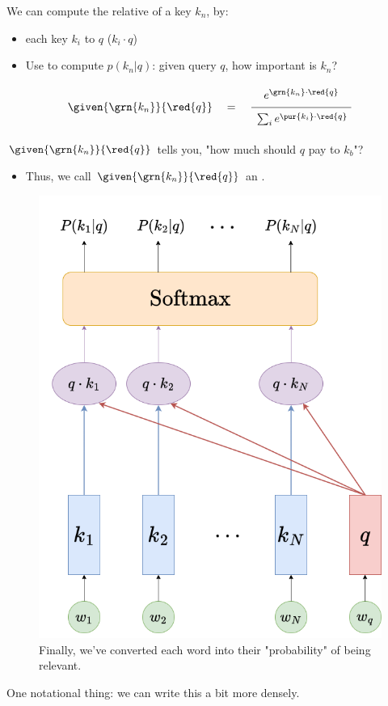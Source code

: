         \begin{kequation}
            We can compute the relative  of a key $k_n$, by:

            \begin{itemize}
                \item {} each key $k_i$ to $q$ ($k_i \cdot q$)

                \item Use  to compute $p(k_n|q)$: given query $q$, how important is $k_n$?
            \end{itemize}


            \begin{equation*}
                    \given{ \grn{k_n} }{ \red{q} } 
                    \quad=\quad
                    \frac{ \phantom{\Big|}  e^{\grn{k_n} \cdot \red{q}} \phantom{\Big|}}
                    {\phantom{\Big|} \sum_i e^{\pur{k_i} \cdot \red{q} } \phantom{\Big|}}
            \end{equation*}

            $\given{ \grn{k_n} }{ \red{q} }$ tells you, "how much  should $q$ pay to $k_b$"? 

            \begin{itemize}
                \item Thus, we call $\given{ \grn{k_n} }{ \red{q} }$ an .
            \end{itemize}
        \end{kequation}

        \begin{figure}[H]
            \centering
            \includegraphics[width=0.3\linewidth]{images/transformers_images/softmax_attention.png}
            \caption*{Finally, we've converted each word into their "probability" of being relevant.}
        \end{figure}

        One notational thing: we can write this a bit more densely.

